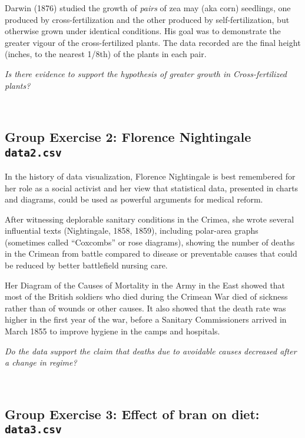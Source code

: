 \documentclass[]{article}
\begin{document}
Darwin (1876) studied the growth of \emph{pairs} of zea may (aka corn)
seedlings, one produced by cross-fertilization and the other produced by
self-fertilization, but otherwise grown under identical conditions. His
goal was to demonstrate the greater vigour of the cross-fertilized
plants. The data recorded are the final height (inches, to the nearest
1/8th) of the plants in each pair.

{\emph{Is there evidence to support the hypothesis of greater growth in
Cross-fertilized plants?}}

~

\hypertarget{group-exercise-2-florence-nightingale-data2.csv}{%
\subsection{\texorpdfstring{Group Exercise 2: Florence Nightingale
\texttt{data2.csv}}{Group Exercise 2: Florence Nightingale data2.csv}}\label{group-exercise-2-florence-nightingale-data2.csv}}

In the history of data visualization, Florence Nightingale is best
remembered for her role as a social activist and her view that
statistical data, presented in charts and diagrams, could be used as
powerful arguments for medical reform.

After witnessing deplorable sanitary conditions in the Crimea, she wrote
several influential texts (Nightingale, 1858, 1859), including
polar-area graphs (sometimes called ``Coxcombs'' or rose diagrams),
showing the number of deaths in the Crimean from battle compared to
disease or preventable causes that could be reduced by better
battlefield nursing care.

Her Diagram of the Causes of Mortality in the Army in the East showed
that most of the British soldiers who died during the Crimean War died
of sickness rather than of wounds or other causes. It also showed that
the death rate was higher in the first year of the war, before a
Sanitary Commissioners arrived in March 1855 to improve hygiene in the
camps and hospitals.

{\emph{Do the data support the claim that deaths due to avoidable causes
decreased after a change in regime?}}

~

\hypertarget{group-exercise-3-effect-of-bran-on-diet-data3.csv}{%
\subsection{\texorpdfstring{Group Exercise 3: Effect of bran on diet:
\texttt{data3.csv}}{Group Exercise 3: Effect of bran on diet: data3.csv}}\label{group-exercise-3-effect-of-bran-on-diet-data3.csv}}
\end{document}
